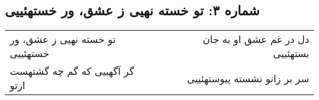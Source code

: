 \begin{center}
\section*{شماره ۳: تو خسته نهیی ز عشق، ور خستهئییی}
\label{sec:003}
\begin{longtable}{l p{0.5cm} r}
تو خسته نهیی ز عشق، ور خستهئییی
&&
دل در غم عشق او به جان بستهئییی
\\
گر آگهییی که گم چه گشتهست ازتو
&&
سر بر زانو نشسته پیوستهئییی
\\
\end{longtable}
\end{center}
